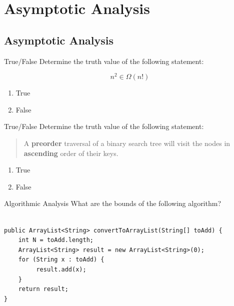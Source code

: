 \documentclass[9pt]{beamer}
\title{\themidterm}
\author{\theauthors}
\institute{\theorganization}
\date{\thedate}
\begin{document}

\begin{frame}
  \titlepage
\end{frame}

\section{Asymptotic Analysis}
\subsection{Asymptotic Analysis}

\begin{frame}[fragile]{True/False}
  Determine the truth value of the following statement:

  \[n^2 \in \Omega(n!)\]

  \begin{enumerate}
    \item
      True
    \item
      \alert<2>{False}
  \end{enumerate}
\end{frame}

\begin{frame}[fragile]{True/False}
  Determine the truth value of the following statement:

  \begin{quote}
    A {\bf preorder} traversal of a binary search tree will visit the nodes
    in {\bf ascending} order of their keys.
  \end{quote}

  \begin{enumerate}
    \item
      True
    \item
      \alert<2->{False}
  \end{enumerate}

\end{frame}

\begin{frame}[fragile]{Algorithmic Analysis}
What are the bounds of the following algorithm? \\
\\
{ \small
\begin{lstlisting}
public ArrayList<String> convertToArrayList(String[] toAdd) {
    int N = toAdd.length;
    ArrayList<String> result = new ArrayList<String>(0);
    for (String x : toAdd) {
         result.add(x);
    }
    return result;
}
  \end{lstlisting}
  }
\end{frame}
\end{document}

